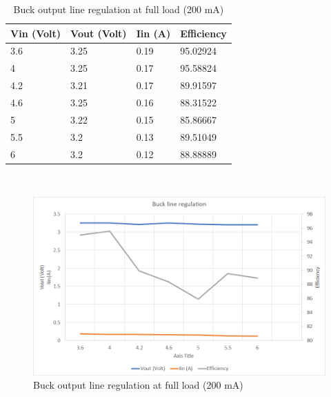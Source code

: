 \begin{table}[H]
\centering
\begin{tabular}{|l|l|l|l|}
\hline
Vin (Volt) & Vout (Volt) & Iin (A) & Efficiency \\ \hline
3.6        & 3.25        & 0.19    & 95.02924   \\ \hline
4          & 3.25        & 0.17    & 95.58824   \\ \hline
4.2        & 3.21        & 0.17    & 89.91597   \\ \hline
4.6        & 3.25        & 0.16    & 88.31522   \\ \hline
5          & 3.22        & 0.15    & 85.86667   \\ \hline
5.5        & 3.2         & 0.13    & 89.51049   \\ \hline
6          & 3.2         & 0.12    & 88.88889   \\ \hline
\end{tabular}
\caption{Buck output line regulation at full load (200 mA)}
\label{table:4}
\end{table}
\\
\begin{figure}[H]
	\centering
	\includegraphics[width=\columnwidth]{IMGS/Buck output line regulation at full load (200mA).png}
	\caption{Buck output line regulation at full load (200 mA)}
	\label{fig:arch}
\end{figure}

